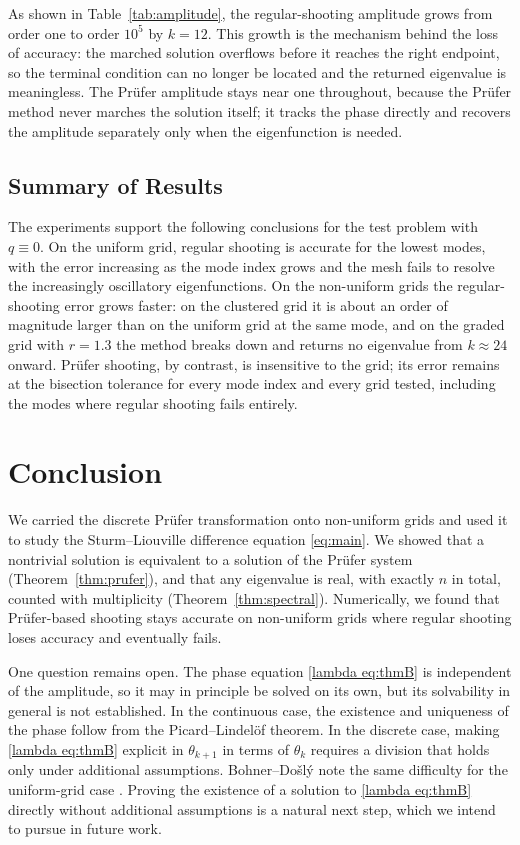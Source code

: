\documentclass[12pt,reqno]{amsart}
\numberwithin{equation}{section}
\begin{document}
As shown in Table~\ref{tab:amplitude}, the regular-shooting amplitude grows from order one to order $10^{5}$ by $k = 12$. This growth is the mechanism behind the loss of accuracy: the marched solution overflows before it reaches the right endpoint, so the terminal condition can no longer be located and the returned eigenvalue is meaningless. The Pr\"ufer amplitude stays near one throughout, because the Pr\"ufer method never marches the solution itself; it tracks the phase directly and recovers the amplitude separately only when the eigenfunction is needed. 

\subsection{Summary of Results}
\label{subsec:summary}
The experiments support the following conclusions for the test problem with $q \equiv 0$. On the uniform grid, regular shooting is accurate for the lowest modes, with the error increasing as the mode index grows and the mesh fails to resolve the increasingly oscillatory eigenfunctions. On the non-uniform grids the regular-shooting error grows faster: on the clustered grid it is about an order of magnitude larger than on the uniform grid at the same mode, and on the graded grid with $r = 1.3$ the method breaks down and returns no eigenvalue from $k \approx 24$ onward. Pr\"ufer shooting, by contrast, is insensitive to the grid; its error remains at the bisection tolerance for every mode index and every grid tested, including the modes where regular shooting fails entirely.

\section{Conclusion}
\label{sec:conclusion}
We carried the discrete Pr\"ufer transformation onto non-uniform grids and used it to study the Sturm--Liouville difference equation \eqref{eq:main}. We showed that a nontrivial solution is equivalent to a solution of the Pr\"ufer system (Theorem~\ref{thm:prufer}), and that any eigenvalue is real, with exactly $n$ in total, counted with multiplicity (Theorem~\ref{thm:spectral}). Numerically, we found that Pr\"ufer-based shooting stays accurate on non-uniform grids where regular shooting loses accuracy and eventually fails. 

One question remains open. The phase equation \eqref{lambda eq:thmB} is independent of the amplitude, so it may in principle be solved on its own, but its solvability in general is not established. In the continuous case, the existence and uniqueness of the phase follow from the Picard--Lindel\"of theorem. In the discrete case, making \eqref{lambda eq:thmB} explicit in $\theta_{k+1}$ in terms of $\theta_k$ requires a division that holds only under additional assumptions. Bohner--Do\v{s}l\'y note the same difficulty for the uniform-grid case \cite[Remark 2.2, p.~2718]{bohner-dosly}. Proving the existence of a solution to \eqref{lambda eq:thmB} directly without additional assumptions is a natural next step, which we intend to pursue in future work.
\end{document}
